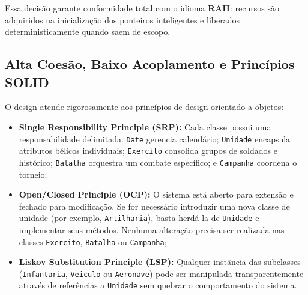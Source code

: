 \documentclass[12pt,a4paper]{article}
\begin{document}
Essa decisão garante conformidade total com o idioma \textbf{RAII}: recursos são adquiridos na inicialização dos ponteiros inteligentes e liberados deterministicamente quando saem de escopo.

\subsection{Alta Coesão, Baixo Acoplamento e Princípios SOLID}
O design atende rigorosamente aos princípios de design orientado a objetos:
\begin{itemize}
    \item \textbf{Single Responsibility Principle (SRP):} Cada classe possui uma responsabilidade delimitada. \texttt{Date} gerencia calendário; \texttt{Unidade} encapsula atributos bélicos individuais; \texttt{Exercito} consolida grupos de soldados e histórico; \texttt{Batalha} orquestra um combate específico; e \texttt{Campanha} coordena o torneio;
    \item \textbf{Open/Closed Principle (OCP):} O sistema está aberto para extensão e fechado para modificação. Se for necessário introduzir uma nova classe de unidade (por exemplo, \texttt{Artilharia}), basta herdá-la de \texttt{Unidade} e implementar seus métodos. Nenhuma alteração precisa ser realizada nas classes \texttt{Exercito}, \texttt{Batalha} ou \texttt{Campanha};
    \item \textbf{Liskov Substitution Principle (LSP):} Qualquer instância das subclasses (\texttt{Infantaria}, \texttt{Veiculo} ou \texttt{Aeronave}) pode ser manipulada transparentemente através de referências a \texttt{Unidade} sem quebrar o comportamento do sistema.
\end{itemize}
\end{document}
